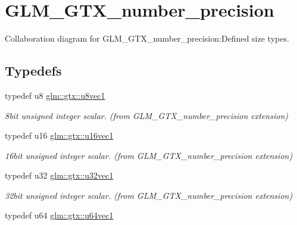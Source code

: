 \hypertarget{group__gtx__number__precision}{
\section{GLM\_\-GTX\_\-number\_\-precision}
\label{group__gtx__number__precision}
}


Collaboration diagram for GLM\_\-GTX\_\-number\_\-precision:Defined size types.  
\subsection*{Typedefs}
\begin{CompactItemize}
\item 
\hypertarget{group__gtx__number__precision_g35ae7849593a354420e4f52d1b36c2d6}{
typedef u8 \hyperlink{group__gtx__number__precision_g35ae7849593a354420e4f52d1b36c2d6}{glm::gtx::u8vec1}}
\label{group__gtx__number__precision_g35ae7849593a354420e4f52d1b36c2d6}

\begin{CompactList}\small\item\em 8bit unsigned integer scalar. (from GLM\_\-GTX\_\-number\_\-precision extension) \item\end{CompactList}\item 
\hypertarget{group__gtx__number__precision_g807d7e5f24e981b1575bd40ca159781d}{
typedef u16 \hyperlink{group__gtx__number__precision_g807d7e5f24e981b1575bd40ca159781d}{glm::gtx::u16vec1}}
\label{group__gtx__number__precision_g807d7e5f24e981b1575bd40ca159781d}

\begin{CompactList}\small\item\em 16bit unsigned integer scalar. (from GLM\_\-GTX\_\-number\_\-precision extension) \item\end{CompactList}\item 
\hypertarget{group__gtx__number__precision_gc46a7890b20928df83e734c3ea9557d4}{
typedef u32 \hyperlink{group__gtx__number__precision_gc46a7890b20928df83e734c3ea9557d4}{glm::gtx::u32vec1}}
\label{group__gtx__number__precision_gc46a7890b20928df83e734c3ea9557d4}

\begin{CompactList}\small\item\em 32bit unsigned integer scalar. (from GLM\_\-GTX\_\-number\_\-precision extension) \item\end{CompactList}\item 
\hypertarget{group__gtx__number__precision_g92812a1d7e746bcaba61d2f5a64afc52}{
typedef u64 \hyperlink{group__gtx__number__precision_g92812a1d7e746bcaba61d2f5a64afc52}{glm::gtx::u64vec1}}
\label{group__gtx__number__precision_g92812a1d7e746bcaba61d2f5a64afc52}


\end{CompactItemize}
